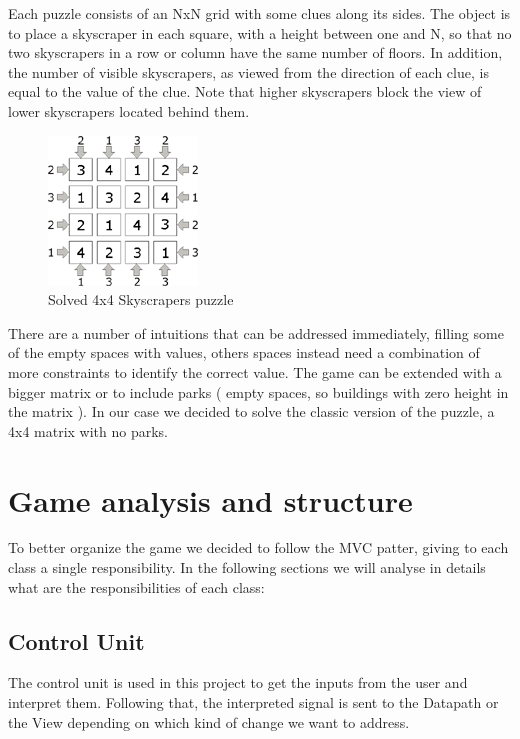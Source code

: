 \documentclass[12pt]{report}
\begin{document}
Each puzzle consists of an NxN grid with some clues along its sides. The
object is to place a skyscraper in each square, with a height between one
and N, so that no two skyscrapers in a row or column have the same number
of floors. In addition, the number of visible skyscrapers, as viewed from
the direction of each clue, is equal to the value of the clue. Note that
higher skyscrapers block the view of lower skyscrapers located behind
them.

\begin{figure}[H]
  \centering
  \includegraphics[keepaspectratio]{images/skyscrapers_small_solved.jpg}
  \caption{Solved 4x4 Skyscrapers puzzle}
\end{figure}

There are a number of intuitions that can be addressed immediately,
filling some of the empty spaces with values, others spaces instead need
a combination of more constraints to identify the correct value. The game
can be extended with a bigger matrix or to include parks ( empty spaces, so
buildings with zero height in the matrix ). In our case we decided to
solve the classic version of the puzzle, a 4x4 matrix with no parks.

\chapter*{Game analysis and structure}

To better organize the game we decided to follow the MVC patter, giving to
each class a single responsibility. In the following sections we will
analyse in details what are the responsibilities of each class:

\section*{Control Unit}

The control unit is used in this project to get the inputs from the user
and interpret them. Following that, the interpreted signal is sent to
the Datapath or the View depending on which kind of change we want to
address.
\end{document}
